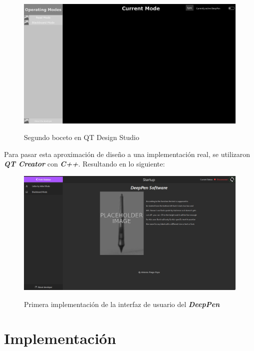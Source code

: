 \begin{figure}[h]
    \centering
    \includegraphics[width=1\textwidth]{capturas/DisenoUsuario2.png}\\[-0,40cm]
    \caption{Segundo boceto en QT Design Studio}
    \end{figure}

Para pasar esta aproximación de diseño a una implementación real, se utilizaron
\textbf{\textit{QT Creator}} con \textbf{\textit{C++}}. Resultando en lo siguiente:

\begin{figure}[h]
    \centering
    \includegraphics[width=1\textwidth]{capturas/Interfaz.png}\\[-0,40cm]
    \caption{Primera implementación de la interfaz de usuario del
    \textbf{\textit{DeepPen}}}
    \end{figure}

\section{Implementación}